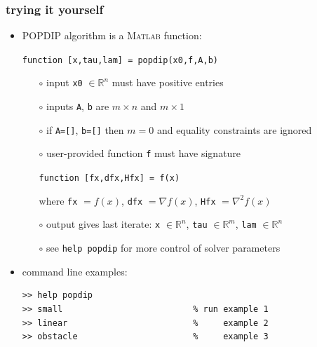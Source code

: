 \documentclass[10pt,hyperref,dvipsnames]{beamer}
\newcommand{\grad}{\nabla}
\newcommand{\RR}{\mathbb{R}}
\newcommand{\Matlab}{\textsc{Matlab}\xspace}
\begin{document}
\begin{frame}[fragile]
\frametitle{trying it yourself}

\begin{itemize}
\item POPDIP algorithm is a \Matlab function:

\medskip
\centerline{\texttt{function [x,tau,lam] = popdip(x0,f,A,b)}}

\medskip
    \begin{itemize}
    \item[$\circ$] input \texttt{x0} $\in\RR^n$ must have positive entries
    \item[$\circ$] inputs \texttt{A}, \texttt{b} are $m\times n$ and $m\times 1$
    \item[$\circ$] if \texttt{A=[]}, \texttt{b=[]} then $m=0$ and equality constraints are ignored
    \item[$\circ$] user-provided function \texttt{f} must have signature

\medskip
\centerline{\texttt{function [fx,dfx,Hfx] = f(x)}}

\medskip
    where \texttt{fx} $=f(x)$, \texttt{dfx} $=\grad f(x)$, \texttt{Hfx} $= \grad^2 f(x)$
    \item[$\circ$] output gives last iterate: \texttt{x} $\in\RR^n$, \texttt{tau} $\in\RR^m$, \texttt{lam} $\in\RR^n$
    \item[$\circ$] see \texttt{help popdip} for more control of solver parameters
    \end{itemize}

\item command line examples:
\begin{Verbatim}[fontsize=\small]
>> help popdip
>> small                          % run example 1
>> linear                         %     example 2
>> obstacle                       %     example 3
\end{Verbatim}
\end{itemize}
\end{frame}
\end{document}
